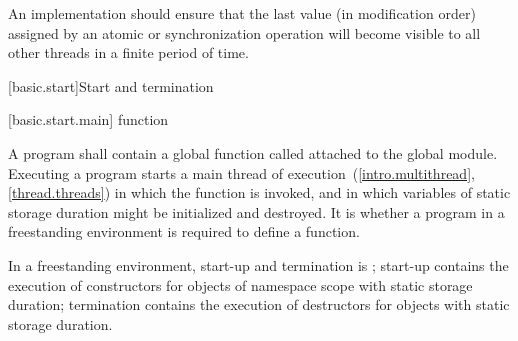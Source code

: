 \pnum
An implementation should ensure that the last value (in modification order)
assigned by an atomic or synchronization operation will become visible to all
other threads in a finite period of time.%
%

[basic.start]{Start and termination}

[basic.start.main]{ function}

\pnum
{}%
A program shall contain a global function called 
attached to the global module.
Executing a program starts a main thread of execution~(\ref{intro.multithread}, \ref{thread.threads})
in which the  function is invoked,
and in which variables of static storage duration
might be initialized and destroyed.
It is 
whether a program in a freestanding environment is required to define a 
function.
\begin{note}
In a freestanding environment, start-up and termination is
; start-up contains the
execution of constructors for objects of namespace scope with static storage duration;
termination contains the execution of destructors for objects with static storage
duration.
\end{note}

